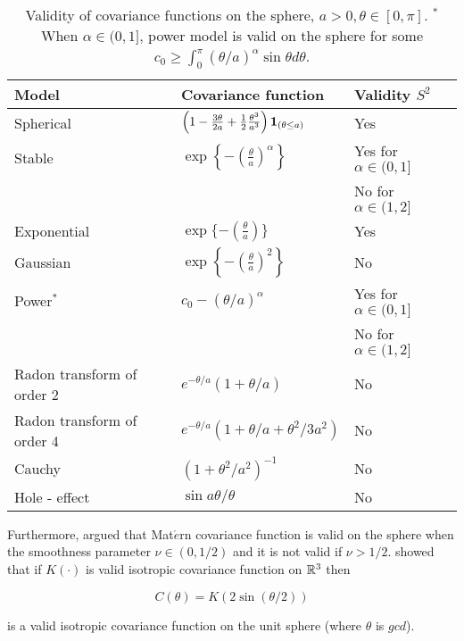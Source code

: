 \begin{table}[H]
	\label{valid_cov_models}
	\centering
	\begin{tabular}[htb]{lll} \hline \hline
		Model & Covariance function & Validity  $S^2$           \\   \hline Spherical  &
		$\left(1-\frac{3\theta}{2a} + \frac{1}{2}
		\frac{\theta^3}{a^3}\right){\bf 1}_{(\theta \le a)}$ & Yes   \\
		[2ex]
		Stable     & $\exp\left\{-\left(\frac{\theta}{a}\right)^\alpha\right\}$ & Yes for $\alpha \in (0,1]$  \\
		      &                     & No for $\alpha \in (1,2]$ \\ [2ex] \hspace{0.2in} Exponential &
		$\exp \{-\left(\frac{\theta}{a}\right) \}$ & Yes \\ [2ex]
		\hspace{0.2in} Gaussian & $\exp\left\{-\left(\frac{\theta}{a} \right)^2
		\right\}$  & No \\ [2ex]
		Power$^*$   & $c_0 - (\theta/a)^\alpha$ & Yes for  $\alpha \in (0,1] $  \\
		& & No for $\alpha \in (1,2]$ \\ [2ex]
		Radon transform of order 2         & $e^{-\theta/a}(1+\theta/a)$ &
		No        \\ [2ex] Radon transform of order 4         &
		$e^{-\theta/a} (1+\theta/a+\theta^2/3a^2)$  & No  \\ [2ex] Cauchy &
		$(1+\theta^2/a^2)^{-1}$ &  No      \\ [2ex] Hole - effect & $\sin
		a\theta / \theta$ & No    \\ \hline \hline
	\end{tabular}
	\caption{Validity of covariance functions on the sphere, $a >
		0,\theta \in [0,\pi]$. $^*$When $\alpha \in (0,1]$, power model is
			valid on the sphere  for some $c_0 \ge \int_0^\pi
			(\theta/a)^{\alpha} \sin \theta d \theta$.} \label{tab:t1}
				
	\end{table}
	
	Furthermore, \cite{Gneiting2013} argued that Mat$\acute{e}$rn covariance function is valid on the sphere when the smoothness parameter $\nu\in(0,1/2)$ and it is not valid if $\nu>1/2$. \cite{Yadrenko1983} showed that if $K(\cdot)$ is valid isotropic covariance function on $\mathbb{R}^3$ then
	
	\[
		C(\theta) = K(2\sin(\theta/2))
	\]
	
	is a valid isotropic covariance function on the unit sphere (where $\theta$ is $gcd$).
	
